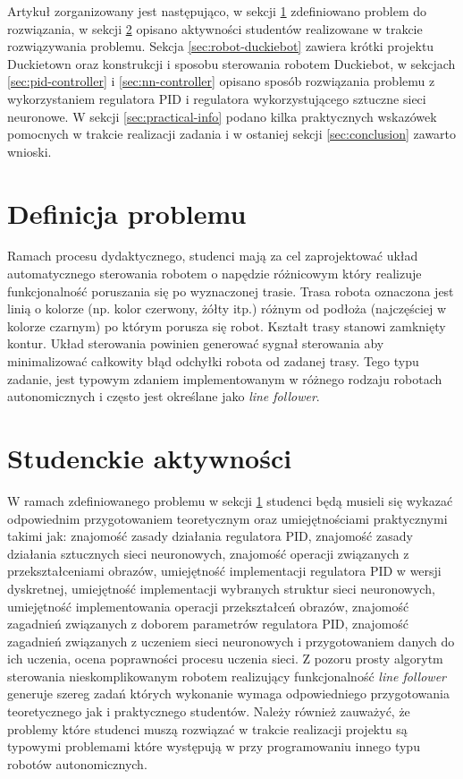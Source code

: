 \documentclass[conference]{IEEEtran}
\begin{document}
Artykuł zorganizowany jest następująco, w sekcji \ref{sec:problem-definition} zdefiniowano problem do rozwiązania, w sekcji \ref{sec:student-activity} opisano aktywności studentów realizowane w trakcie rozwiązywania  problemu. Sekcja \ref{sec:robot-duckiebot} zawiera krótki projektu Duckietown oraz konstrukcji i sposobu sterowania robotem Duckiebot, w sekcjach \ref{sec:pid-controller} i \ref{sec:nn-controller} opisano sposób rozwiązania problemu z wykorzystaniem regulatora PID i regulatora wykorzystującego sztuczne sieci neuronowe. W sekcji \ref{sec:practical-info} podano kilka praktycznych wskazówek pomocnych w trakcie realizacji zadania i w ostaniej sekcji \ref{sec:conclusion} zawarto wnioski.


\section{Definicja problemu}\label{sec:problem-definition}
Ramach procesu dydaktycznego, studenci mają za cel zaprojektować układ automatycznego sterowania robotem o napędzie różnicowym który realizuje funkcjonalność poruszania się po wyznaczonej trasie. Trasa robota oznaczona jest linią o kolorze (np. kolor czerwony, żółty itp.) różnym od podłoża (najczęściej w kolorze czarnym) po którym porusza się robot. Kształt trasy stanowi zamknięty kontur. Układ sterowania powinien generować sygnał sterowania aby minimalizować całkowity błąd odchyłki robota od zadanej trasy.  Tego typu zadanie, jest typowym zdaniem implementowanym w różnego rodzaju robotach autonomicznych i często jest określane jako \emph{line follower}.  


\section{Studenckie aktywności}\label{sec:student-activity}
W ramach zdefiniowanego problemu w sekcji \ref{sec:problem-definition} studenci będą musieli się wykazać odpowiednim przygotowaniem teoretycznym oraz umiejętnościami praktycznymi takimi jak: 
znajomość zasady działania regulatora PID, znajomość zasady działania sztucznych sieci neuronowych, znajomość operacji związanych z przekształceniami obrazów, umiejętność implementacji regulatora PID w wersji dyskretnej, umiejętność implementacji wybranych struktur sieci neuronowych, umiejętność implementowania operacji przekształceń obrazów, znajomość zagadnień związanych z doborem parametrów regulatora PID, znajomość zagadnień związanych z uczeniem sieci neuronowych i przygotowaniem danych do ich uczenia, ocena poprawności procesu uczenia sieci. Z pozoru prosty algorytm sterowania nieskomplikowanym robotem realizujący funkcjonalność \emph{line follower} generuje szereg zadań których wykonanie wymaga odpowiedniego przygotowania teoretycznego jak i praktycznego studentów. Należy również zauważyć, że problemy które studenci muszą rozwiązać w trakcie realizacji projektu są typowymi problemami które występują w przy programowaniu innego typu robotów autonomicznych.
\end{document}
